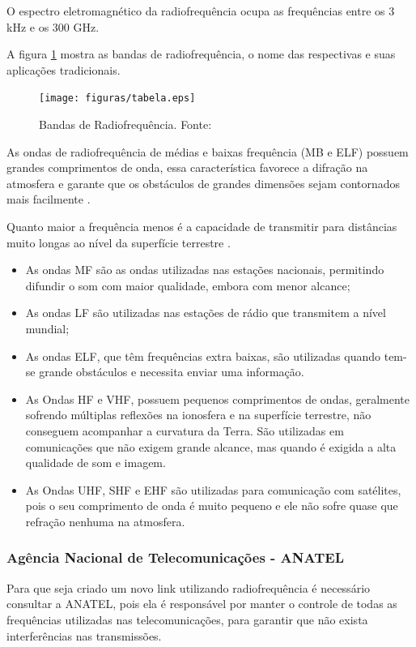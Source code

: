 O espectro eletromagnético da radiofrequência ocupa as frequências entre os 3 kHz e os 300 GHz. 

A figura \ref{fig:tabela} mostra as bandas de radiofrequência, o nome das respectivas e suas aplicações tradicionais.

\begin{figure}[h!]
	\centering
	  \texttt{[image: figuras/tabela.eps]}
	\caption{Bandas de Radiofrequência. Fonte: \cite{tabela}}
	\label{fig:tabela}
\end{figure}

As ondas de radiofrequência de médias e baixas frequência (MB e ELF) possuem grandes comprimentos de onda, essa característica favorece a difração na atmosfera e garante que os obstáculos de grandes dimensões sejam contornados mais facilmente \cite{Rappaport2}.

Quanto maior a frequência menos é a capacidade de transmitir para distâncias muito longas ao nível da superfície terrestre \cite{VALLE1}. 

\begin{itemize}
	\item As ondas MF são as ondas utilizadas nas estações nacionais, permitindo difundir o som com maior qualidade, embora com menor alcance;
	\item As ondas LF são utilizadas nas estações de rádio que transmitem a nível mundial;
	\item As ondas ELF, que têm frequências extra baixas, são utilizadas quando tem-se grande obstáculos e necessita enviar uma informação. 
	\item As Ondas HF e VHF, possuem pequenos comprimentos de ondas, geralmente sofrendo múltiplas reflexões na ionosfera e na superfície terrestre, não conseguem acompanhar a curvatura da Terra. São utilizadas em comunicações que não exigem grande alcance, mas quando é exigida a alta qualidade de som e imagem.
	\item As Ondas UHF, SHF e EHF são utilizadas para comunicação com satélites, pois o seu comprimento de onda é muito pequeno e ele não sofre quase que refração nenhuma na atmosfera. 
\end{itemize} 

\subsubsection{Agência Nacional de Telecomunicações - ANATEL}

Para que seja criado um novo link utilizando radiofrequência é necessário consultar a ANATEL, pois ela é responsável por manter o controle de todas as frequências utilizadas nas telecomunicações, para garantir que não exista interferências nas transmissões.

